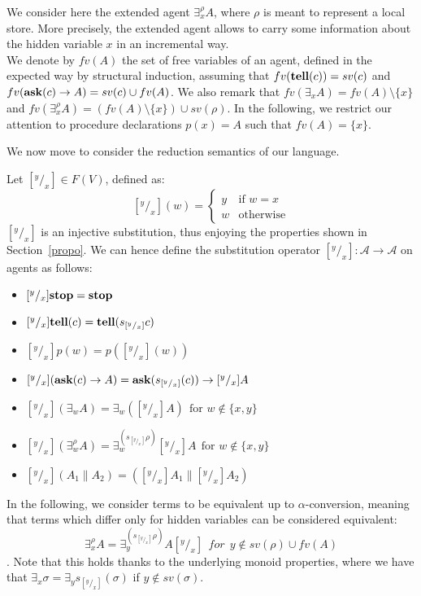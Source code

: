\documentclass{llncs}
\newcommand{\tell}{{\bf tell}}
\newcommand{\ask}{{\bf ask}}
\newcommand{\ostop}{{\bf stop}}
\newcommand{\rarrow}{\rightarrow}
\begin{document}
We consider here the extended agent $\exists^{\rho}_x A$, where $\rho$ is meant to represent a local store. More precisely, the extended agent allows to carry some information about the hidden variable $x$ in an incremental way. \\
We denote by $fv(A)$ the set of free variables of an agent, defined in the expected way 
by structural induction, assuming that $fv(\tell(c)) = sv(c)$ and
$fv(\ask(c) \rightarrow A) = sv(c) \cup fv(A)$. We also remark that $fv(\exists_x A) = fv(A) \setminus 
\{x\}$ and $fv(\exists^{\rho}_x A) = (fv(A) \setminus \{x\}) \cup sv(\rho)$.
%
In the following, we restrict our attention to 
procedure declarations $p(x) = A$ such that $fv(A) = \{x\}$.

We now move to consider the reduction semantics of our language.

\begin{definition}[Substitutions]
Let $[^y/_x] \in F(V)$, defined as: 
\[ [^y/_x](w) = 
		\begin{cases} 
			y & \text{if $w = x$} \\
            w & \text{otherwise}
        \end{cases} \]
$[^y/_x]$ is an injective substitution, thus enjoying the properties shown in Section~\ref{propo}.
We can hence define the substitution operator $[^y/_x]: \mathcal{A} \rarrow \mathcal{A}$ on agents as follows: 

\begin{itemize}
	\item $[^y/_x] \ostop = \ostop$
	\item $[^y/_x] \tell(c) = \tell(s_{[^y/_x]}c)$
	\item $[^y/_x] p(w) =  p([^y/_x](w))$
	\item $[^y/_x] (\ask(c) \rightarrow A) = \ask(s_{[^y/_x]}(c)) \rightarrow [^y/_x] A$
	\item $[^y/_x] (\exists_w A)  = \exists_w ([^y/_x] A) \ \ \text{for $w \not \in \{x, y\}$}$
    \item $[^y/_x] (\exists^{\rho}_w A) = \exists^{(s_{[^y/_x]} \rho)}_w [^y/_x]A \ \
    \text{for $w \not \in \{x, y\}$}$
	\item $[^y/_x](A_1 \parallel A_2)  = ([^y/_x] A_1 \parallel [^y/_x] A_2)$
\end{itemize}
\end{definition}

\begin{remark}
In the following, we consider terms to be equivalent up to $\alpha$-conversion, meaning that terms which differ only for hidden variables can be considered equivalent:
\[\exists_x^\rho A = \exists_y^{(s_{[^y/_x]}\rho)} A [^y/_x] \ \ for \ \ y \not \in sv(\rho) \cup fv(A)\].
Note that this holds thanks to the underlying monoid properties, where we have that $\exists_x \sigma = \exists_y s_{[^y/_x]}(\sigma)$ if $y \not \in sv(\sigma)$.
\end{remark}
\end{document}
